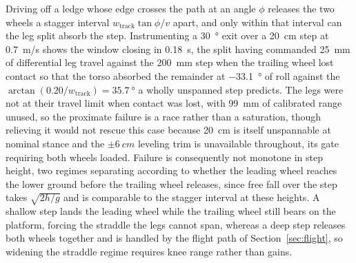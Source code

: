 \documentclass[a4paper,fleqn]{cas-dc}
\begin{document}
Driving off a ledge whose edge crosses the path at an angle $\phi$ releases the
two wheels a stagger interval $w_{\text{track}}\tan\phi/v$ apart, and only within
that interval can the leg split absorb the step. Instrumenting a \SI{30}{\degree}
exit over a \SI{20}{cm} step at \SI{0.7}{m/s} shows the window closing in
\SI{0.18}{s}, the split having commanded \SI{25}{mm} of differential leg travel
against the \SI{200}{mm} step when the trailing wheel lost contact so that the
torso absorbed the remainder at \SI{-33.1}{\degree} of roll against the
$\arctan(0.20/w_{\text{track}}){=}\SI{35.7}{\degree}$ a wholly unspanned step
predicts. The legs were not at their travel limit when contact was lost, with
\SI{99}{mm} of calibrated range unused, so the proximate failure is a race rather
than a saturation, though relieving it would not rescue this case because
\SI{20}{cm} is itself unspannable at nominal stance and the $\pm\SI{6}{cm}$
leveling trim is unavailable throughout, its gate requiring both wheels loaded.
Failure is consequently not monotone in step height, two regimes separating
according to whether the leading wheel reaches the lower ground before the
trailing wheel releases, since free fall over the step takes $\sqrt{2h/g}$ and is
comparable to the stagger interval at these heights. A shallow step lands the
leading wheel while the trailing wheel still bears on the platform, forcing the
straddle the legs cannot span, whereas a deep step releases both wheels together
and is handled by the flight path of Section~\ref{sec:flight}, so widening the
straddle regime requires knee range rather than gains.
\end{document}
